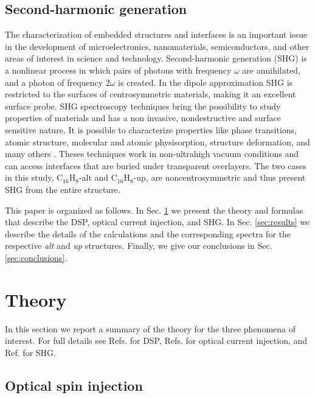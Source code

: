 \documentclass[pss]{wiley2sp} %
\begin{document}
\subsection{Second-harmonic generation}

The characterization of embedded structures and interfaces is an important
issue in the development of microelectronics, nanomaterials, semiconductors,
and other areas of interest in science and technology. Second-harmonic
generation (SHG) is a nonlinear process in which pairs of photons with frequency
$\omega$ are annihilated, and a photon of frequency $2\omega$ is
created. In the dipole approximation SHG is restricted to the surfaces of
centrosymmetric materials, making it an excellent surface probe. SHG
spectroscopy techniques bring the possibility to study properties of materials
and has a non invasive, nondestructive and surface sensitive nature. It is
possible to characterize properties like phase transitions, atomic structure,
molecular and atomic physisorption, structure deformation, and many others
\cite{dadapPRB97,godefroyAPL96,salazarPRB14,mendozaPRL98}. Theses techniques
work in non-ultrahigh vacuum conditions and can access interfaces that are
buried under transparent overlayers. The two cases in this study,
C$_{16}$H$_{8}$-alt and C$_{16}$H$_{8}$-up, are noncentrosymmetric and thus
present SHG from the entire structure.

This paper is organized as follows. In Sec. \ref{sec:theory} we present the
theory and formulas that describe the DSP, optical current injection, and SHG.
In Sec. \ref{sec:results} we describe the details of the calculations and the
corresponding spectra for the respective \emph{alt} and \emph{up} structures.
Finally, we give our conclusions in Sec. \ref{sec:conclusions}.


\section{Theory}\label{sec:theory}

In this section we report a summary of the theory for the three phenomena of
interest. For full details see Refs. \cite{nastosPRB07,mendozaPRB12} for DSP,
Refs. \cite{cabellosPRB11,sipePRB00} for optical current injection, and Ref.
\cite{andersonPRB15} for SHG.


\subsection{Optical spin injection}\label{sec:theory-DSP}
\end{document}
